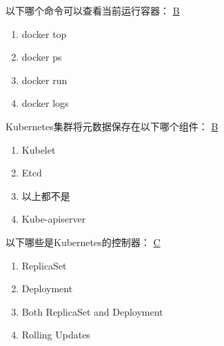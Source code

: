 \begin{problem}
	以下哪个命令可以查看当前运行容器：
	\uline{B}    
    \vspace{-0.8em}
    \begin{multicols}{4}
        \begin{enumerate}[label=\Alph*.]
            \item docker top
            \item docker ps
            \item docker run
            \item docker logs
        \end{enumerate}
    \end{multicols}
    \vspace{-1em}
\end{problem}



\begin{problem}
	Kubernetes集群将元数据保存在以下哪个组件：
	\uline{B}    
    \vspace{-0.8em}
    \begin{multicols}{4}
        \begin{enumerate}[label=\Alph*.]
            \item Kubelet
            \item Etcd
            \item 以上都不是
            \item Kube-apiserver
        \end{enumerate}
    \end{multicols}
    \vspace{-1em}
\end{problem}



\begin{problem}
	以下哪些是Kubernetes的控制器：
	\uline{C}    
    \vspace{-0.8em}
    \begin{multicols}{2}
        \begin{enumerate}[label=\Alph*.]
            \item ReplicaSet
            \item Deployment
            \item Both ReplicaSet and Deployment
            \item Rolling Updates
        \end{enumerate}
    \end{multicols}
    \vspace{-1em}
\end{problem}



